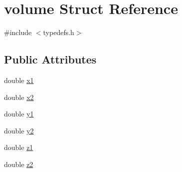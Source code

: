\hypertarget{structvolume}{\section{volume Struct Reference}
\label{da/d4c/structvolume}
}


{\ttfamily \#include $<$typedefs.\-h$>$}

\subsection*{Public Attributes}
\begin{DoxyCompactItemize}
\item 
double \hyperlink{structvolume_a67e3a66484093a6ec6946824d3fd5fd5}{x1}
\item 
double \hyperlink{structvolume_aea372c2df8c4172fcbe94ccb00f2f41c}{x2}
\item 
double \hyperlink{structvolume_a2f927294450145289da7bcb8ed6d2fc2}{y1}
\item 
double \hyperlink{structvolume_a24d8999d68967311704e2899d4566a66}{y2}
\item 
double \hyperlink{structvolume_a4d9121fcbb4204419b5e74eafa2d300b}{z1}
\item 
double \hyperlink{structvolume_af1e16b7b95e7b579b015634d911090eb}{z2}
\end{DoxyCompactItemize}


